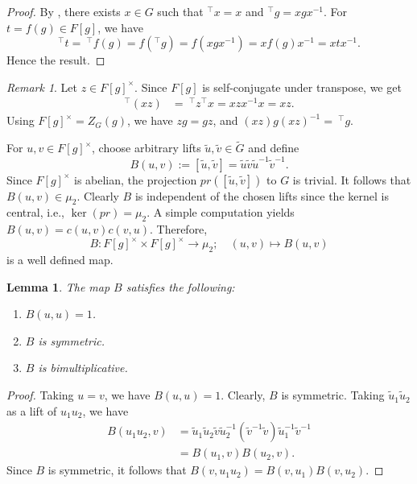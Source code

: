\documentclass[11pt, a4paper, reqno]{amsart}
\newtheorem{lemma}[theorem]{Lemma}
\theoremstyle{definition}
\theoremstyle{remark}
\newtheorem{remark}[theorem]{Remark}
\theoremstyle{example}
\theoremstyle{note}
\numberwithin{equation}{section}
\begin{document}
\begin{proof} By \cite[Lemma~2]{Tupan2006}, there exists $x\in G$ such that $^{\top}x=x$ and $^{\top}g=xgx^{-1}$. For $t=f(g)\in F[g]$, we have 
\[^{\top}t= ~^{\top}f(g)=f(^{\top}g)=f(xgx^{-1})=xf(g)x^{-1}=xtx^{-1}.\] 
Hence the result. \qedhere

\end{proof}

\begin{remark}\label{xz is a symmetric conjugator of g} Let $z\in F[g]^\times$. Since $F[g]$ is self-conjugate under transpose, we get
\begin{align*}
^{\top}(xz)
&= ~^{\top}z^{\top}x=xzx^{-1}x=xz.
\end{align*}
Using $F[g]^{\times}=Z_{G}(g)$, we have $zg=gz$, and $(xz)g(xz)^{-1}= ~^{\top}g$. \\
\end{remark}

For $u,v\in F[g]^\times$, choose arbitrary lifts $\tilde{u},\tilde{v}\in\widetilde{G}$ and define
\begin{equation}\label{definition of B}
B(u,v):=[\tilde{u},\tilde{v}]
=\tilde{u}\tilde{v}\tilde{u}^{-1}\tilde{v}^{-1}.
\end{equation}
Since $F[g]^{\times}$ is abelian, the projection  $pr([\tilde{u},\tilde{v}])$ to $G$ is trivial. It follows that 
$B(u,v)\in\mu_2$. 
Clearly $B$ is independent of the chosen lifts since the kernel is
central, i.e., $\ker(pr) = \mu_2$. A simple computation yields $B(u,v)=c(u,v) c(v,u).$ Therefore, $$B:F[g]^\times \times F[g]^\times \longrightarrow \mu_2; \quad (u, v) \longmapsto B(u, v)$$ is a well defined map. 


\begin{lemma}\label{properties of the map B} The map $B$ satisfies the following:
\begin{enumerate}
\item[\emph{1)}] $B(u, u) = 1$. 
\smallskip
\item[\emph{2)}] $B$ is symmetric.%
\smallskip
\item[\emph{3)}] $B$ is bimultiplicative. 
\end{enumerate}
\end{lemma}

\begin{proof} Taking $u=v$, we have $B(u,u)=1$.  Clearly, $B$ is symmetric.  Taking $\tilde{u}_1  \tilde{u}_2$ as a lift of $u_1 u_2$, we have
\begin{align*}
    B(u_1u_2,v) &= \tilde{u}_1  \tilde{u}_2 \tilde v \tilde{u}_2^{-1} (\tilde{v}^{-1} \tilde{v})\tilde{u}_1^{-1} \tilde{v}^{-1} \\
    &= B(u_1,v) B(u_2,v).
\end{align*}
Since $B$ is symmetric, it follows that $B(v, u_1u_2)=B(v,u_1)B(v,u_2).$ 
\end{proof}
\end{document}
